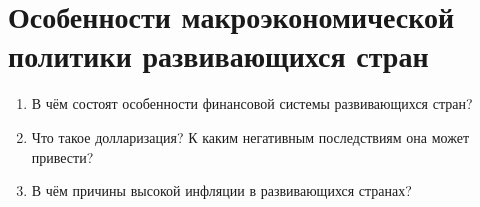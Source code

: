 \documentclass[10pt, a4paper]{extarticle}
\begin{document}
\section{Особенности макроэкономической политики развивающихся стран}
\begin{enumerate}[label=\alph*)]
	\item В чём состоят особенности финансовой системы развивающихся стран?
	\item Что такое долларизация? К каким негативным последствиям она может привести? 
	\item В чём причины высокой инфляции в развивающихся странах?
\end{enumerate}
\end{document}
